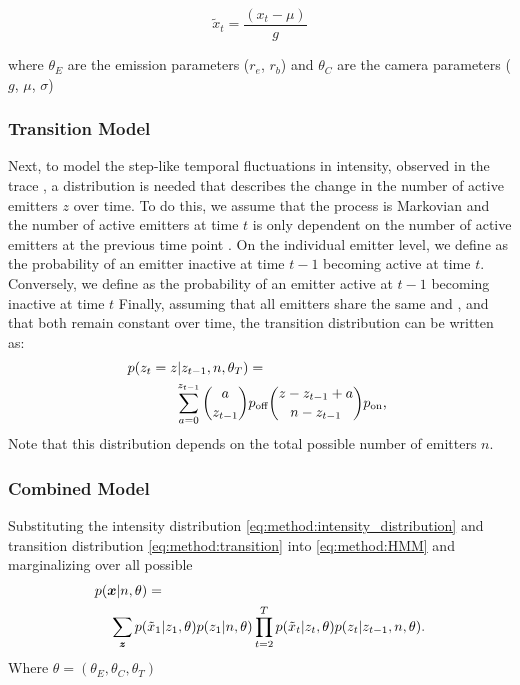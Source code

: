  \begin{equation*}
    \tilde{x}_{t} = \frac{(x_{t} - \mu)}{g}
  \end{equation*}

  where $\theta_{E}$ are the emission parameters ($r_{e}$, $r_{b}$) and 
  $\theta_{C}$ are the camera parameters ($g$, $\mu$, $\sigma$)

\subsubsection{Transition Model}
Next, to model the step-like temporal fluctuations in intensity, observed in the trace \trace, 
  a distribution is needed that describes the change in the number of active emitters $z$ over time. 
  To do this, we assume that the process is Markovian and the number of active emitters  
  at time $t$ is only dependent on the number of active emitters at the previous time point .
  On the individual emitter level, we define \pon as the probability of an emitter inactive at time $t-1$ becoming active at time $t$. 
  Conversely,  we define \poff as the probability of an emitter active at $t-1$ becoming inactive at time $t$ 
  Finally, assuming that all emitters share the same \pon and \poff, and that both remain constant over time, 
  the transition distribution can be written as:
  \begin{align}
    \label{eq:method:transition}
    p(z_{t} = z | z_{t-1}, n, \theta_{T}) &=\\
    \sum_{a = 0}^{z_{t-1}}
      {a \choose z_{t-1}}
      &\poff
      {z - z_{t-1} + a \choose \n - z_{t-1}}
      \pon
      \text{,} \notag\
  \end{align}
  Note that this distribution depends on the total possible number of  emitters $n$.

\subsubsection{Combined Model}

Substituting the intensity distribution \eqref{eq:method:intensity_distribution} 
and transition distribution \eqref{eq:method:transition} 
into \eqref{eq:method:HMM} and marginalizing over all possible \states
% 
\begin{align}
  \label{eq:method:likelihood}
  p(\bm{x}|n,\theta) &=\\
    \sum_{\bm{z}}
      p(&\tilde{x}_{1}|z_{1}, \theta)
      p(z_{1}|n, \theta)
      \prod_{t=2}^{T}
        p(\tilde{x}_{t}|z_{t}, \theta)
        p(z_{t}|z_{t-1},n, \theta)
    \notag
  \text{.}
\end{align}
%
Where $\theta = (\theta_{E}, \theta_{C}, \theta_{T})$

